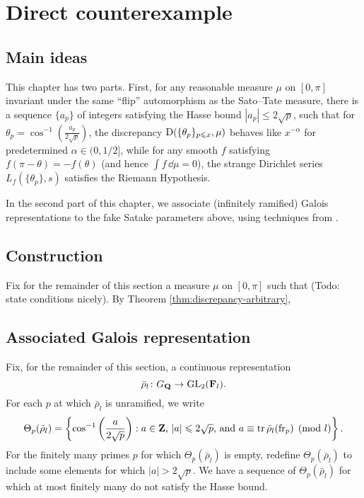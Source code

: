 
\chapter{Direct counterexample}





\section{Main ideas}

This chapter has two parts. First, for any reasonable measure $\mu$ on 
$[0,\pi]$ invariant under the same ``flip'' automorphism as the Sato--Tate 
measure, there is a sequence $\{a_p\}$ of integers satisfying the Hasse 
bound $|a_p|\leqslant 2\sqrt p$, such that for 
$\theta_p = \cos^{-1}\left(\frac{a_p}{2\sqrt p}\right)$, the discrepancy 
$\operatorname{D}(\{\theta_p\}_{p\leqslant x},\mu)$ behaves like $x^{-\alpha}$ for 
predetermined $\alpha\in (0,1/2]$, while for any smooth $f$ satisfying 
$f(\pi-\theta) = -f(\theta)$ (and hence $\int f\, \dd\mu = 0$), the 
strange Dirichlet series $L_f(\{\theta_p\},s)$ satisfies the Riemann 
Hypothesis. 

In the second part of this chapter, we associate (infinitely ramified) Galois 
representations to the fake Satake parameters above, using techniques from 
\cite{pande-2011,khare-larsen-ramakrishna-2005}. 





\section{Construction}

Fix for the remainder of this section a measure $\mu$ on $[0,\pi]$ such that 
(Todo: state conditions nicely). By Theorem \ref{thm:discrepancy-arbitrary}, 





\section{Associated Galois representation}



Fix, for the remainder of this section, a continuous representation 
\[
	\bar\rho_l \colon G_{\mathbf{Q}} \to \operatorname{GL}_2(\mathbf{F}_l) .
\]
For each $p$ at which $\bar\rho_l$ is unramified, we write 
\[
	\Theta_p(\bar\rho_l) = \left\{\cos^{-1}\left(\frac{a}{2\sqrt p}\right) : a\in \mathbf{Z}\text{, }|a|\leqslant 2\sqrt p\text{, and }a\equiv \operatorname{tr}\bar\rho_l(\mathrm{fr}_p)\pmod l\right\} .
\]
For the finitely many primes $p$ for which $\Theta_p(\bar\rho_l)$ is empty, 
redefine $\Theta_p(\bar\rho_l)$ to include some elements for which 
$|a|>2\sqrt p$. We have a sequence of $\Theta_p(\bar\rho_l)$ for which at most 
finitely many do not satisfy the Hasse bound. 

